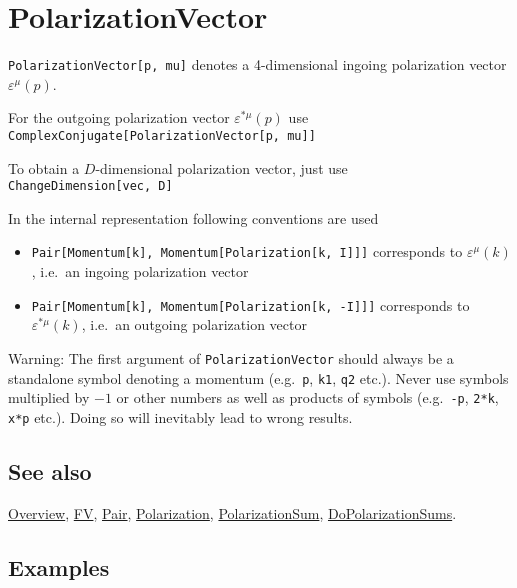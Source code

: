 \documentclass[../FeynCalcManual.tex]{subfiles}
\begin{document}
\hypertarget{polarizationvector}{
\section{PolarizationVector}\label{polarizationvector}}

\texttt{PolarizationVector[\allowbreak{}p,\ \allowbreak{}mu]} denotes a
4-dimensional ingoing polarization vector \(\varepsilon^\mu(p)\).

For the outgoing polarization vector \(\varepsilon^{\ast \mu}(p)\) use
\texttt{ComplexConjugate[\allowbreak{}PolarizationVector[\allowbreak{}p,\ \allowbreak{}mu]]}

To obtain a \(D\)-dimensional polarization vector, just use
\texttt{ChangeDimension[\allowbreak{}vec,\ \allowbreak{}D]}

In the internal representation following conventions are used

\begin{itemize}
\item
  \texttt{Pair[\allowbreak{}Momentum[\allowbreak{}k],\ \allowbreak{}Momentum[\allowbreak{}Polarization[\allowbreak{}k,\ \allowbreak{}I]]]}
  corresponds to \(\varepsilon^{\mu}(k)\), i.e.~an ingoing polarization
  vector
\item
  \texttt{Pair[\allowbreak{}Momentum[\allowbreak{}k],\ \allowbreak{}Momentum[\allowbreak{}Polarization[\allowbreak{}k,\ \allowbreak{}-I]]]}
  corresponds to \(\varepsilon^{\ast \mu}(k)\), i.e.~an outgoing
  polarization vector
\end{itemize}

Warning: The first argument of \texttt{PolarizationVector} should always
be a standalone symbol denoting a momentum (e.g.~\texttt{p},
\texttt{k1}, \texttt{q2} etc.). Never use symbols multiplied by \(-1\)
or other numbers as well as products of symbols (e.g.~\texttt{-p},
\texttt{2*k}, \texttt{x*p} etc.). Doing so will inevitably lead to wrong
results.

\subsection{See also}

\hyperlink{toc}{Overview}, \hyperlink{fv}{FV}, \hyperlink{pair}{Pair},
\hyperlink{polarization}{Polarization},
\hyperlink{polarizationsum}{PolarizationSum},
\hyperlink{dopolarizationsums}{DoPolarizationSums}.

\subsection{Examples}
\end{document}
